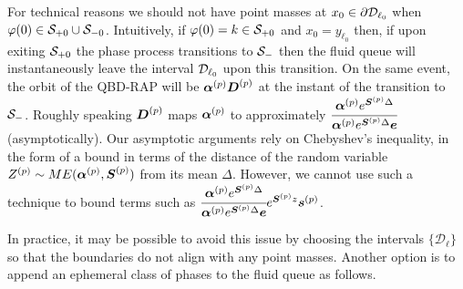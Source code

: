 \begin{rem}
For technical reasons we should not have point masses at \(x_0\in\partial \mathcal{D}_{\ell_0}\) when \(\varphi(0)\in\mathcal{S}_{+0}\cup\mathcal{S}_{-0}\). Intuitively, if \(\varphi(0)=k\in\mathcal{S}_{+0}\) and \(x_0 = y_{\ell_0}\) then, if upon exiting \(\mathcal{S}_{+0}\) the phase process transitions to \(\mathcal{S}_-\) then the fluid queue will instantaneously leave the interval \(\mathcal{D}_{\ell_0}\) upon this transition. On the same event, the orbit of the QBD-RAP will be \(\boldsymbol \alpha^{(p)} \boldsymbol D^{(p)}\) at the instant of the transition to \(\mathcal{S}_-\). Roughly speaking \(\boldsymbol D^{(p)}\) maps \(\boldsymbol \alpha^{(p)}\) to approximately \(\cfrac{\boldsymbol \alpha^{(p)} e^{\boldsymbol S^{(p)}\Delta}}{\boldsymbol \alpha^{(p)} e^{\boldsymbol S^{(p)}\Delta}\boldsymbol e}\) (asymptotically). Our asymptotic arguments rely on Chebyshev's inequality, in the form of a bound in terms of the distance of the random variable \(Z^{(p)}\sim ME(\boldsymbol\alpha^{(p)},\boldsymbol S^{(p)})\) from its mean \(\Delta\). However, we cannot use such a technique to bound terms such as \(\cfrac{\boldsymbol \alpha^{(p)} e^{\boldsymbol S^{(p)}\Delta}}{\boldsymbol \alpha^{(p)} e^{\boldsymbol S^{(p)}\Delta}\boldsymbol e}e^{\boldsymbol S^{(p)}z}\boldsymbol s^{(p)}\). %

In practice, it may be possible to avoid this issue by choosing the intervals \(\{\mathcal D_\ell\}\) so that the boundaries do not align with any point masses. Another option is to append an ephemeral class of phases to the fluid queue as follows. 


\end{rem}

